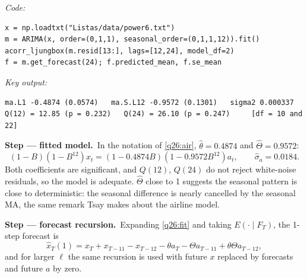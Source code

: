 \documentclass[11pt,a4paper]{article}
\newcommand{\passo}[2]{\par\smallskip\noindent\textbf{Step --- #1.}~#2}
\begin{document}
\begin{sol}
\noindent\textit{Code:}
\begingroup\footnotesize
\begin{verbatim}
x = np.loadtxt("Listas/data/power6.txt")
m = ARIMA(x, order=(0,1,1), seasonal_order=(0,1,1,12)).fit()
acorr_ljungbox(m.resid[13:], lags=[12,24], model_df=2)
f = m.get_forecast(24); f.predicted_mean, f.se_mean
\end{verbatim}
\endgroup
\noindent\textit{Key output:}
\begingroup\footnotesize
\begin{verbatim}
ma.L1 -0.4874 (0.0574)   ma.S.L12 -0.9572 (0.1301)   sigma2 0.000337
Q(12) = 12.85 (p = 0.232)   Q(24) = 26.10 (p = 0.247)     [df = 10 and 22]
\end{verbatim}
\endgroup
\passo{fitted model}{In the notation of \eqref{q26:air}, $\hat\theta=0.4874$ and $\hat\Theta=0.9572$:}
\begin{equation}\label{q26:fit} (1-B)(1-B^{12})x_t=(1-0.4874B)(1-0.9572B^{12})a_t,\qquad \hat\sigma_a=0.0184 . \end{equation}
Both coefficients are significant, and $Q(12)$, $Q(24)$ do not reject white-noise residuals, so the model is
adequate. $\hat\Theta$ close to 1 suggests the seasonal pattern is close to deterministic: the seasonal
difference is nearly cancelled by the seasonal MA, the same remark Tsay makes about the airline model.

\passo{forecast recursion}{Expanding \eqref{q26:fit} and taking $E(\cdot\mid F_T)$, the 1-step forecast is}
\begin{equation}\label{q26:f1} \hat x_T(1)=x_T+x_{T-11}-x_{T-12}-\theta a_T-\Theta a_{T-11}+\theta\Theta a_{T-12}, \end{equation}
and for larger $\ell$ the same recursion is used with future $x$ replaced by forecasts and future $a$ by zero.


\end{sol}
\end{document}
